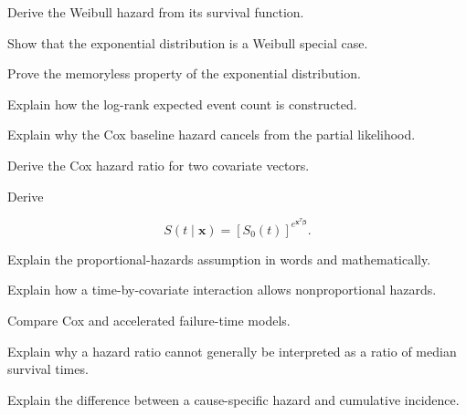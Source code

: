 \begin{exercise}[3]
Derive the Weibull hazard from its survival function.
\end{exercise}

\begin{exercise}[3]
Show that the exponential distribution is a Weibull special case.
\end{exercise}

\begin{exercise}[3]
Prove the memoryless property of the exponential distribution.
\end{exercise}

\begin{exercise}[3]
Explain how the log-rank expected event count is constructed.
\end{exercise}

\begin{exercise}[3]
Explain why the Cox baseline hazard cancels from the partial likelihood.
\end{exercise}

\begin{exercise}[3]
Derive the Cox hazard ratio for two covariate vectors.
\end{exercise}

\begin{exercise}[3]
Derive

\[
S
(
t\mid\mathbf{x}
)
=
[
S_0(t)
]^{
e^{\mathbf{x}^T\boldsymbol{\beta}}
}.
\]
\end{exercise}

\begin{exercise}[3]
Explain the proportional-hazards assumption in words and mathematically.
\end{exercise}

\begin{exercise}[3]
Explain how a time-by-covariate interaction allows nonproportional
hazards.
\end{exercise}

\begin{exercise}[3]
Compare Cox and accelerated failure-time models.
\end{exercise}

\begin{exercise}[3]
Explain why a hazard ratio cannot generally be interpreted as a ratio of
median survival times.
\end{exercise}

\begin{exercise}[3]
Explain the difference between a cause-specific hazard and cumulative
incidence.
\end{exercise}

